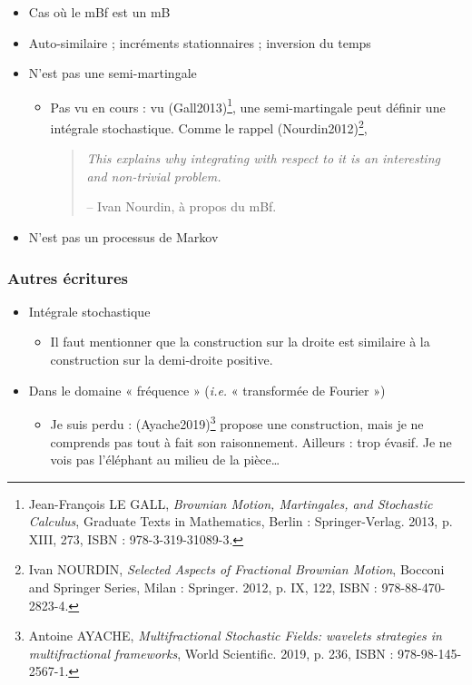 \documentclass[11pt]{article}
\begin{document}
\begin{itemize}
\item Cas où le mBf est un mB
\item Auto-similaire ; incréments stationnaires ; inversion du temps
\item N'est pas une semi-martingale
\begin{itemize}
\item Pas vu en cours : vu (Gall2013)\footnote{Jean-François LE GALL, \emph{Brownian Motion, Martingales, and
Stochastic Calculus}, Graduate Texts in Mathematics, Berlin :
Springer-Verlag. 2013, p. XIII, 273, ISBN : 978-3-319-31089-3.}, une semi-martingale peut
définir une intégrale stochastique. Comme le rappel
(Nourdin2012)\footnote{Ivan NOURDIN, \emph{Selected Aspects of Fractional Brownian Motion},
Bocconi and Springer Series, Milan : Springer. 2012, p. IX, 122,
ISBN : 978-88-470-2823-4.},
\begin{quote}
    \emph{This explains why integrating with respect to it is an interesting
and non-trivial problem.}

-- Ivan Nourdin, à propos du mBf.
\end{quote}
\end{itemize}
\item N'est pas un processus de Markov
\end{itemize}
\subsubsection{Autres écritures}
\label{sec:orge047a83}
\begin{itemize}
\item Intégrale stochastique
\begin{itemize}
\item Il faut mentionner que la construction sur la droite est similaire
à la construction sur la demi-droite positive.
\end{itemize}
\item Dans le domaine « fréquence » (\emph{i.e.} « transformée de Fourier »)
\begin{itemize}
\item Je suis perdu : (Ayache2019)\footnote{Antoine AYACHE, \emph{Multifractional Stochastic Fields: wavelets
strategies in multifractional frameworks}, World Scientific. 2019,
p. 236, ISBN : 978-98-145-2567-1.\label{org178f8ac}} propose une construction, mais
je ne comprends pas tout à fait son raisonnement. Ailleurs : trop
évasif. Je ne vois pas l'éléphant au milieu de la pièce\ldots{}
\end{itemize}
\end{itemize}
\end{document}
